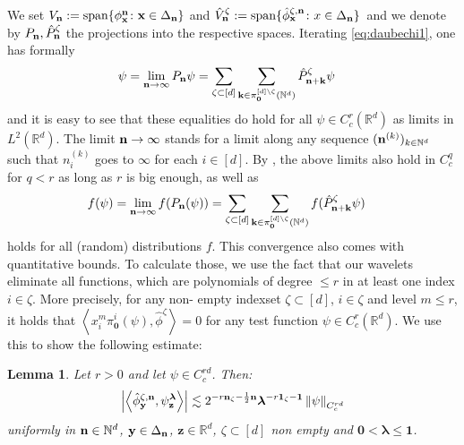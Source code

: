 \documentclass[12pt]{article}
\numberwithin{equation}{section}
\theoremstyle{plain}
\newtheorem{lemma}[theorem]{Lemma}
\theoremstyle{definition}
\newcommand{\abs}[1]{\left\vert #1 \right\vert}
\newcommand{\scalar}[1]{\left\langle #1 \right\rangle}
\newcommand{\norm}[1]{\left\Vert #1\right\Vert}
\def\bR{\mathbb{R}}\def\bS{\mathbb{S}}
\def\fk{\mathbf k}\def\fl{\mathbf l}
\def\fy{\mathbf y}\def\fz{\mathbf z}
\def\flambda{{\boldsymbol\lambda}}
\def\foo{{\boldsymbol 0}}
\def\fone{{\boldsymbol 1}}
\begin{document}
We set $V_{\mathbf n} := \text{span}\{\phi_{\mathbf x}^{\mathbf n}\colon \mathbf x\in\Delta_{\mathbf n}\}$ and $\hat V_{\mathbf n}^\zeta := \text{span}\{\hat\phi^{\zeta,\mathbf n}_{\mathbf x}\colon x\in\Delta_{\mathbf n}\}$\, and we denote by  $P_{\mathbf n},\hat P_{\mathbf n}^{\zeta}$ the projections into the respective spaces. Iterating \eqref{eq:daubechi1}, one has formally 
%
\begin{align*}
    \psi &= \lim_{\fn\to\infty} P_{\fn}\psi = \sum_{\zeta\subset[d]}\sum_{\fk\in\pi_{\mathbf{0}}^{[d]\setminus \zeta}(\bN^d)}\hat P^\zeta_{\fn+\fk}\psi
\end{align*}
and it is easy to see that these equalities do hold for all $\psi\in C_c^r(\bR^d)$ as limits in $L^2(\bR^d)$. The limit $\mathbf n\to\infty$ stands for a limit along any sequence $(\mathbf n^{(k)})_{k\in\mathbb{N}^d}$ such that $n^{(k)}_i$ goes to $\infty$ for each $i\in[d]$. By \cite[Lemma 62]{kern2021}, the above limits also hold in $C_c^q$ for $q<r$ as long as $r$ is big enough, as well as 
%
\begin{align*}
    f(\psi) &= \lim_{\fn\to\infty} f(P_{\fn}(\psi)) = \sum_{\zeta\subset[d]}\sum_{\fk\in\pi_{\mathbf{0}}^{[d]\setminus \zeta}(\bN^d)}f(\hat P^\zeta_{\fn+\fk}\psi)
\end{align*}
%
holds for all (random) distributions $f$. This convergence also comes with quantitative bounds. To calculate those, we use the fact that our wavelets eliminate all functions, which are polynomials of degree $\le r$ in at least one index $i\in\zeta$. More precisely, for any non- empty indexset $\zeta\subset[d]$, $i\in\zeta$ and level $m\le r$, it holds that $\scalar{x_i^m\pi_{\mathbf{0}}^{i}(\psi) , \hat\phi^\zeta} = 0$ for any test function $\psi\in C_c^r(\bR^d)$. We use this to show the following estimate:

\begin{lemma}\label{lem:inequalityPhi}
   Let $r>0$ and let $\psi\in C_c^{rd}$. Then:
    \begin{equation*}
\abs{\scalar{\hat\phi^{\zeta,\fn}_{\fy},\psi^{\flambda}_{\fz}}} \lesssim   2^{-r\fn_\zeta-\frac 12\fn}\flambda^{-r\mathbf{1_\zeta}-\fone}\norm{\psi}_{C_c^{rd}}
    \end{equation*}
uniformly in $\mathbf n\in\mathbb{N}^d$, $\fy\in\Delta_{\fn}$, 
 $\fz\in\bR^d$, $\zeta\subset[d]$ 
 non empty and $\foo<\flambda\le \fone$.
 \end{lemma}
\end{document}
